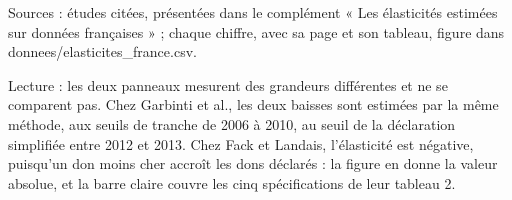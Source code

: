 Sources : études citées, présentées dans le complément « Les élasticités estimées sur données françaises » ; chaque chiffre, avec sa page et son tableau, figure dans donnees/elasticites\_france.csv.\par Lecture : les deux panneaux mesurent des grandeurs différentes et ne se comparent pas. Chez Garbinti et al., les deux baisses sont estimées par la même méthode, aux seuils de tranche de 2006 à 2010, au seuil de la déclaration simplifiée entre 2012 et 2013. Chez Fack et Landais, l'élasticité est négative, puisqu'un don moins cher accroît les dons déclarés : la figure en donne la valeur absolue, et la barre claire couvre les cinq spécifications de leur tableau 2.
